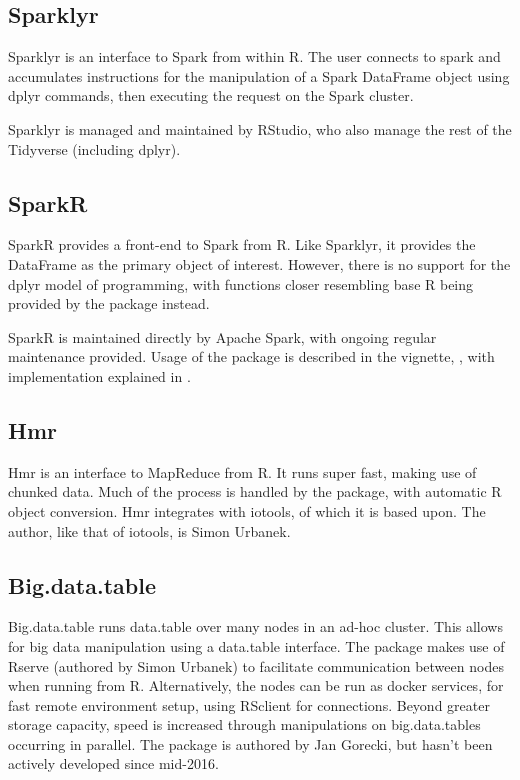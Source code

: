\documentclass[10pt,a4paper]{article}
\begin{document}
\subsection{Sparklyr}
\label{sec:sparklyr}

Sparklyr is an interface to Spark from within R\cite{luraschi20}. The user connects to
spark and accumulates instructions for the manipulation of a Spark
DataFrame object using dplyr commands, then executing the request on
the Spark cluster.

Sparklyr is managed and maintained by RStudio, who also manage the
rest of the Tidyverse (including dplyr).

\subsection{SparkR}
\label{sec:sparkr}

SparkR provides a front-end to Spark from
R\cite{venkataraman20:_spark}. Like Sparklyr, it provides the
DataFrame as the primary object of interest. However, there is no
support for the dplyr model of programming, with functions closer
resembling base R being provided by the package instead.

SparkR is maintained directly by Apache Spark, with ongoing regular
maintenance provided. Usage of the package is described in the
vignette, \textcite{venktaraman19:_spark_pract_guide}, with
implementation explained in \textcite{venkataraman2016sparkr}.

\subsection{Hmr}
\label{sec:hmr}

Hmr is an interface to MapReduce from R\cite{urbanek20}. It runs super
fast, making use of chunked data. Much of the process is handled by
the package, with automatic R object conversion. Hmr integrates with
iotools, of which it is based upon. The author, like that of iotools,
is Simon Urbanek.

\subsection{Big.data.table}
\label{sec:big.data.table}

Big.data.table runs data.table over many nodes in an ad-hoc
cluster\cite{gorecki16}. This allows for big data manipulation using a
data.table interface. The package makes use of Rserve (authored by
Simon Urbanek) to facilitate communication between nodes when running
from R. Alternatively, the nodes can be run as docker services, for
fast remote environment setup, using RSclient for connections. Beyond
greater storage capacity, speed is increased through manipulations on
big.data.tables occurring in parallel. The package is authored by Jan
Gorecki, but hasn't been actively developed since mid-2016.
\end{document}
